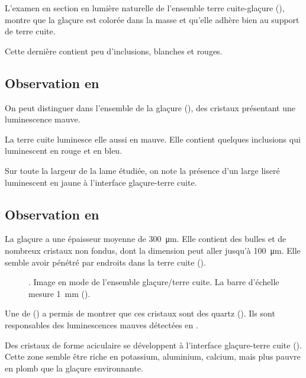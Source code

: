 L'examen en section en lumière naturelle de l'ensemble terre 
cuite-glaçure (), montre que la glaçure est 
colorée dans la masse et qu'elle adhère bien au support de terre cuite.

Cette dernière contient peu d'inclusions, blanches et rouges.

\subsection{Observation en \CL}
On peut distinguer dans l'ensemble de la glaçure 
(), des cristaux présentant une 
luminescence mauve.

La terre cuite luminesce elle aussi en mauve. Elle contient quelques 
inclusions qui luminescent en rouge et en bleu.

Sur toute la largeur de la lame étudiée, on note la présence d'un 
large liseré luminescent en jaune à l'interface glaçure-terre cuite.


\subsection{Observation en \MEB[ie]}
La glaçure a une épaisseur moyenne de \SI{300}{\um}. Elle contient 
des bulles et de nombreux cristaux non fondus, dont la dimension peut 
aller jusqu'à \SI{100}{\um}. Elle semble avoir pénétré par endroits 
dans la terre cuite ().

\begin{figure}[htb]
  \caption[\ -- Observation de la texture au \MEB, 
           en mode \ERD. Ensemble glaçure/terre cuite]
          {\legendeB.
           Image en mode \ERD de l'ensemble glaçure/terre cuite. 
           La barre d'échelle mesure \SI{1}{\mm} ().}
  \label{MEB:6529_img}
\end{figure}

Une \carto de \RX () a permis de montrer 
que ces cristaux sont des quartz (\quartz). Ils sont responsables 
des luminescences mauves détectées en \CL.

Des cristaux de forme aciculaire se développent à l'interface 
glaçure-terre cuite (). Cette zone semble être 
riche en potassium, aluminium, calcium, mais plus pauvre en plomb que 
la glaçure environnante.


